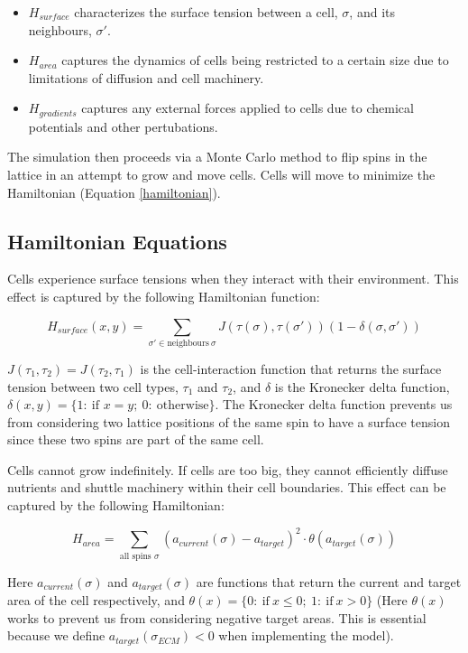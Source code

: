 \documentclass[12pt]{article}
\begin{document}
\begin{itemize}
	\item $H_{surface}$ characterizes the surface tension between a cell, $\sigma$, and its neighbours, $\sigma'$.
	\item $H_{area}$ captures the dynamics of cells being restricted to a certain size due to limitations of diffusion and cell machinery. 
	\item $H_{gradients}$ captures any external forces applied to cells due to chemical potentials and other pertubations.
\end{itemize}

The simulation then proceeds via a Monte Carlo method to flip spins in the lattice in an attempt to grow and move cells. Cells will move to minimize the Hamiltonian (Equation \ref{hamiltonian}).

\subsection{Hamiltonian Equations}
Cells experience surface tensions when they interact with their environment. This effect is captured by the following Hamiltonian function:

\begin{equation}
	H_{surface} (x,y) = \sum_{\sigma' \in \text{neighbours}~\sigma} J(\tau(\sigma), \tau(\sigma'))(1-\delta(\sigma, \sigma'))
\end{equation}

$J(\tau_1, \tau_2)=J(\tau_2, \tau_1)$ is the cell-interaction function that returns the surface tension between two cell types, $\tau_1$ and $\tau_2$, and $\delta$ is the Kronecker delta function, $\delta(x,y)=\{1:~\text{if }x=y;~0:~\text{otherwise}\}$. The Kronecker delta function prevents us from considering two lattice positions of the same spin to have a surface tension since these two spins are part of the same cell.

Cells cannot grow indefinitely. If cells are too big, they cannot efficiently diffuse nutrients and shuttle machinery within their cell boundaries. This effect can be captured by the following Hamiltonian:

\begin{equation}
	H_{area} = \sum_{\text{all spins }\sigma} (a_{current}(\sigma)-a_{target})^2 \cdot \theta(a_{target}(\sigma))
	\label{H_area}
\end{equation}

Here $a_{current}(\sigma)$ and $a_{target}(\sigma)$ are functions that return the current and target area of the cell respectively, and $\theta(x)=\{0:~\text{if}~x\leq 0;~1:~\text{if}~x>0\}$ (Here $\theta(x)$ works to prevent us from considering negative target areas. This is essential because we define $a_{target}(\sigma_{ECM}) < 0$ when implementing the model).
\end{document}
